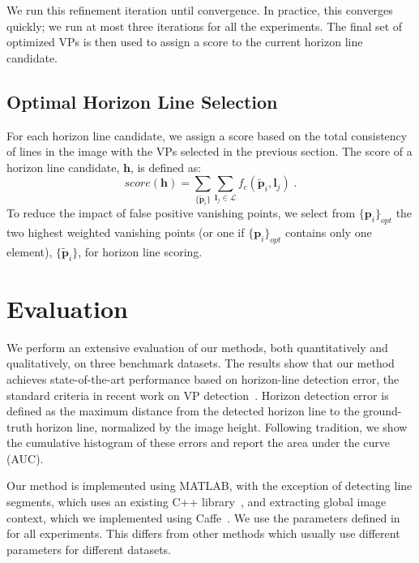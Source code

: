 We run this refinement iteration until convergence. In practice, this
converges quickly; we run at most three iterations for all the
experiments. The final set of optimized VPs is then used to assign a
score to the current horizon line candidate.

\subsection{Optimal Horizon Line Selection}
\label{sec:horizonscoring}

For each horizon line candidate, we assign a score based on the total
consistency of lines in the image with the VPs selected in the
previous section.  The score of a horizon line candidate, $\mathbf{h}$, is
defined as:
\begin{equation}
  score(\mathbf{h}) = \sum_{\{\tilde{\mathbf{p}}_i\}} \sum_{\mathbf{l}_j \in
    \mathcal{L}}f_c(\tilde{\mathbf{p}}_i, \mathbf{l}_j) \; .
\end{equation}
To reduce the impact of false positive vanishing points, we select
from $\{\mathbf{p}_i\}_{opt}$ the two highest weighted vanishing points (or
one if $\{\mathbf{p}_i\}_{opt}$ contains only one element),
$\{\tilde{\mathbf{p}}_i\}$, for horizon line scoring.

%
%
\section{Evaluation}
\label{sec:evaluation_fast}

We perform an extensive evaluation of our methods, both quantitatively
and qualitatively, on three benchmark datasets. The results show that
our method achieves state-of-the-art performance based on horizon-line
detection error, the standard criteria in recent work on VP
detection~\cite{geoparser2010,alignment2014,selfsketch2012,kitware2013}.
Horizon detection error is defined as the maximum distance from the
detected horizon line to the ground-truth horizon line, normalized by
the image height.  Following tradition, we show the cumulative
histogram of these errors and report the area under the curve (AUC).

Our method is implemented using MATLAB, with the exception of
detecting line segments, which uses an existing C++
library~\cite{lsd2010}, and extracting global image context, which we
implemented using Caffe~\cite{jia2014caffe}. We use the parameters
defined in  for all experiments. This differs from
other methods which usually use different parameters for different
datasets.

